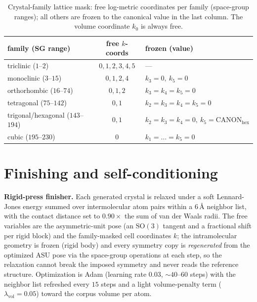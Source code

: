 \documentclass[journal=jcisd8,manuscript=suppinfo]{achemso}
\begin{document}
\begin{table}[h]\centering
\caption{Crystal-family lattice mask: free log-metric coordinates per family
(space-group ranges); all others are frozen to the canonical value in the last
column. The volume coordinate $k_0$ is always free.}
\label{sitab:mask}
\begin{tabular}{lcl}\toprule
family (SG range) & free $k$-coords & frozen (value) \\\midrule
triclinic ($1$--$2$)              & $0,1,2,3,4,5$ & --- \\
monoclinic ($3$--$15$)            & $0,1,2,4$     & $k_3{=}0,\ k_5{=}0$ \\
orthorhombic ($16$--$74$)         & $0,1,2$       & $k_3{=}k_4{=}k_5{=}0$ \\
tetragonal ($75$--$142$)          & $0,1$         & $k_2{=}k_3{=}k_4{=}k_5{=}0$ \\
trigonal/hexagonal ($143$--$194$) & $0,1$         & $k_2{=}k_3{=}k_4{=}0,\ k_5{=}\text{CANON}_{\mathrm{hex}}$ \\
cubic ($195$--$230$)              & $0$           & $k_1{=}\dots{=}k_5{=}0$ \\\bottomrule
\end{tabular}
\end{table}

\section{Finishing and self-conditioning}\label{sisec:finish}
\textbf{Rigid-press finisher.} Each generated crystal is relaxed under a soft
Lennard-Jones energy summed over intermolecular atom pairs within a $6\,\text{\AA}$
neighbor list, with the contact distance set to $0.90\times$ the sum of van der
Waals radii. The free variables are the asymmetric-unit pose (an $\mathrm{SO}(3)$
tangent and a fractional shift per rigid block) and the family-masked cell
coordinates $k$; the intramolecular geometry is frozen (rigid body) and every
symmetry copy is \emph{regenerated} from the optimized ASU pose via the space-group
operations at each step, so the relaxation cannot break the imposed symmetry and
never reads the reference structure. Optimization is Adam (learning rate $0.03$,
$\sim\!40$--$60$ steps) with the neighbor list refreshed every $15$ steps and a
light volume-penalty term ($\lambda_{\mathrm{vol}}=0.05$) toward the corpus volume
per atom.
\end{document}
